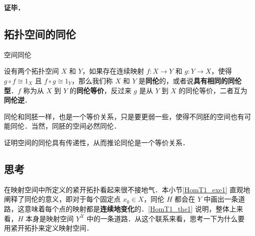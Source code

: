 \textbf{证毕．}

\subsection{拓扑空间的同伦}

\begin{definition}{空间同伦}

设有两个拓扑空间 $X$ 和 $Y$，如果存在连续映射 $f:X\rightarrow Y$ 和 $g: Y\rightarrow X$，使得 $g \circ f \cong 1_X$ 且 $f \circ g \cong 1_Y$，那么我们称 $X$ 和 $Y$ 是\textbf{同伦}的，或者说\textbf{具有相同的同伦型}．$f$ 称为从 $X$ 到 $Y$ 的\textbf{同伦等价}，反过来 $g$ 是从 $Y$ 到 $X$ 的同伦等价，二者互为\textbf{同伦逆}．

\end{definition}

同伦和同胚一样，也是一个等价关系，只是要更弱一些，使得不同胚的空间也有可能同伦．当然，同胚的空间必然同伦．

\begin{exercise}{}
证明空间的同伦具有传递性，从而推论同伦是一个等价关系．
\end{exercise}

\subsection{思考}

在映射空间中所定义的紧开拓扑看起来很不接地气．本小节\autoref{HomT1_exe1} 直观地阐释了同伦的意义，即对于每个固定点 $x_0\in X$，同伦 $H$ 都会在 $Y$ 中画出一条道路，这意味着每个点的映射都是\textbf{连续地变化}的．\autoref{HomT1_the1} 说明，整体上来看，$H$ 本身是映射空间 $Y^X$ 中的一条道路．从这个联系来看，思考一下为什么要用紧开拓扑来定义映射空间．

